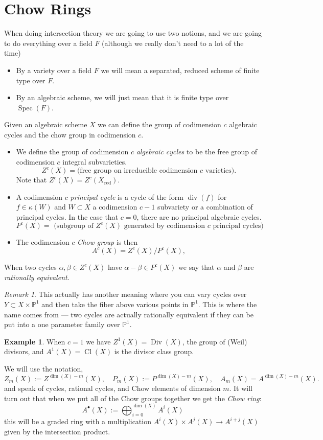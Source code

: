 \documentclass[12pt]{article}
\numberwithin{equation}{section}
\theoremstyle{definition}
\newtheorem{example}[theorem]{Example}
\theoremstyle{remark}
\newtheorem{remark}[theorem]{Remark}
\newcommand{\PP}{\mathbb{P}}
\newcommand{\Spec}{\operatorname{Spec}}
\newcommand{\Div}{\operatorname{Div}}
\renewcommand{\div}{\operatorname{div}}
\newcommand{\Cl}{\operatorname{Cl}}
\newcommand{\red}{\operatorname{red}}
\begin{document}
\section{Chow Rings}
When doing intersection theory we are going to use two notions, and we are going to do everything over a field $F$ (although we really don't need to a lot of the time)
\begin{itemize}
	\item By a variety over a field $F$ we will mean a separated, reduced scheme of finite type over $F$. 
	\item By an algebraic scheme, we will just mean that it is finite type over $\Spec(F)$.
\end{itemize}
Given an algebraic scheme $X$ we can define the group of codimension $c$ algebraic cycles and the chow group in codimension $c$.
\begin{itemize}
	\item We define the group of codimension $c$ \emph{algebraic cycles} to be the free group of codimension $c$ integral subvarieties. 
	$$ Z^c(X) = \mbox{(free group on irreducible codimension $c$ varieties)}.$$
	Note that $Z^c(X) = Z^c(X_{\red})$. 
	\item A codimension $c$ \emph{principal cycle} is a cycle of the form $\div(f)$ for $f\in \kappa(W)$ and $W\subset X$ a codimension $c-1$ subvariety or a combination of principal cycles. In the case that $c=0$, there are no principal algebraic cycles. 
	$$ P^c(X) = \mbox{ (subgroup of $Z^c(X)$ generated by codimension $c$ principal cycles) }$$
	\item The codimension $c$ \emph{Chow group} is then 
	$$ A^c(X) = Z^c(X)/P^c(X),$$
\end{itemize}

When two cycles $\alpha,\beta\in Z^c(X)$ have $\alpha-\beta \in P^c(X)$ we say that $\alpha$ and $\beta$ are \emph{rationally equivalent}. 

\begin{remark}
	This actually has another meaning where you can vary cycles over $Y\subset X\times \PP^1$ and then take the fiber above various points in $\PP^1$.
	This is where the name comes from --- two cycles are actually rationally equivalent if they can be put into a one parameter family over $\PP^1$. 
\end{remark}

\begin{example}
	When $c=1$ we have $Z^1(X) = \Div(X)$, the group of (Weil) divisors, and $A^1(X) = \Cl(X)$ is the divisor class group. 
\end{example}
We will use the notation,
$$ Z_m(X):=Z^{\dim(X)-m}(X), \quad P_m(X):=P^{\dim(X)-m}(X), \quad A_m(X) = A^{\dim(X)-m}(X).$$
and speak of cycles, rational cycles, and Chow elements of dimension $m$. 
It will turn out that when we put all of the Chow groups together we get the \emph{Chow ring}: 
 $$ A^{\bullet}(X) := \bigoplus_{i=0}^{\dim(X)} A^i(X) $$
this will be a graded ring with a multiplication $A^i(X)\times A^j(X) \to A^{i+j}(X)$ given by the intersection product.
\end{document}
